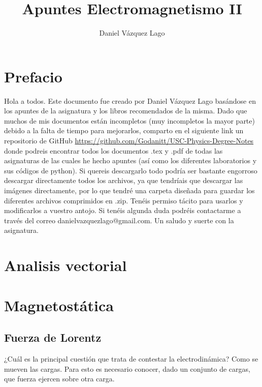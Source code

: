 \documentclass[12pt]{article}
\author{Daniel Vázquez Lago}
\title{Apuntes Electromagnetismo II}
\begin{document}
\maketitle

\newpage

\tableofcontents

\newpage

\section*{Prefacio}

Hola a todos. Este documento fue creado por Daniel Vázquez Lago basándose en los apuntes de la asignatura y los libros recomendados de la misma. Dado que muchos de mis documentos están incompletos (muy incompletos la mayor parte) debido a la falta de tiempo para mejorarlos, comparto en el siguiente link un repositorio de GitHub \url{https://github.com/Godanitt/USC-Physics-Degree-Notes} donde podreis encontrar todos los documentos .tex y .pdf de todas las asignaturas de las cuales he hecho apuntes (así como los diferentes laboratorios y sus códigos de python). Si quereis descargarlo todo podría ser bastante engorroso descargar directamente todos los archivos, ya que tendríais que descargar las imágenes directamente, por lo que tendré una carpeta diseñada para guardar los diferentes archivos comprimidos en .zip. Tenéis permiso tácito para usarlos y modificarlos a vuestro antojo. Si tenéis algunda duda podréis contactarme a través del correo danielvazquezlago@gmail.com. Un saludo y suerte con la asignatura.

\newpage

\section{Analisis vectorial}

\newpage

\section{Magnetostática}

\subsection{Fuerza de Lorentz}

¿Cuál es la principal cuestión que trata de contestar la electrodinámica? Como se mueven las cargas. Para esto es necesario conocer, dado un conjunto de cargas, que fuerza ejercen sobre otra carga. \\
\end{document}
